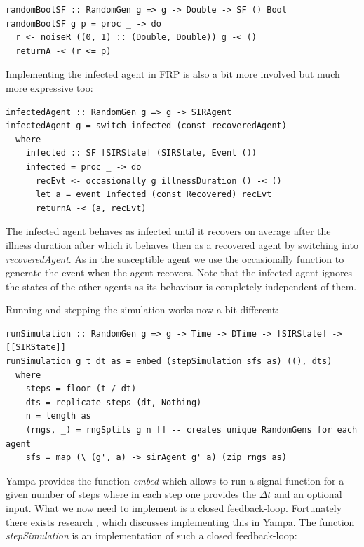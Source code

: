 \begin{verbatim}
randomBoolSF :: RandomGen g => g -> Double -> SF () Bool
randomBoolSF g p = proc _ -> do
  r <- noiseR ((0, 1) :: (Double, Double)) g -< ()
  returnA -< (r <= p)
\end{verbatim}

Implementing the infected agent in FRP is also a bit more involved but much more expressive too:

\begin{verbatim}
infectedAgent :: RandomGen g => g -> SIRAgent
infectedAgent g = switch infected (const recoveredAgent)
  where
    infected :: SF [SIRState] (SIRState, Event ())
    infected = proc _ -> do
      recEvt <- occasionally g illnessDuration () -< ()
      let a = event Infected (const Recovered) recEvt
      returnA -< (a, recEvt)
\end{verbatim}

The infected agent behaves as infected until it recovers on average after the illness duration after which it behaves then as a recovered agent by switching into \textit{recoveredAgent}. As in the susceptible agent we use the occasionally function to generate the event when the agent recovers. Note that the infected agent ignores the states of the other agents as its behaviour is completely independent of them.

Running and stepping the simulation works now a bit different:

\begin{verbatim}
runSimulation :: RandomGen g => g -> Time -> DTime -> [SIRState] -> [[SIRState]]
runSimulation g t dt as = embed (stepSimulation sfs as) ((), dts)
  where
    steps = floor (t / dt)
    dts = replicate steps (dt, Nothing)
    n = length as
    (rngs, _) = rngSplits g n [] -- creates unique RandomGens for each agent
    sfs = map (\ (g', a) -> sirAgent g' a) (zip rngs as)
\end{verbatim}

Yampa provides the function \textit{embed} which allows to run a signal-function for a given number of steps where in each step one provides the $\Delta t$ and an optional input. What we now need to implement is a closed feedback-loop. Fortunately there exists research \cite{nilsson_functional_2002}, \cite{courtney_yampa_2003} which discusses implementing this in Yampa. The function \textit{stepSimulation} is an implementation of such a closed feedback-loop:

